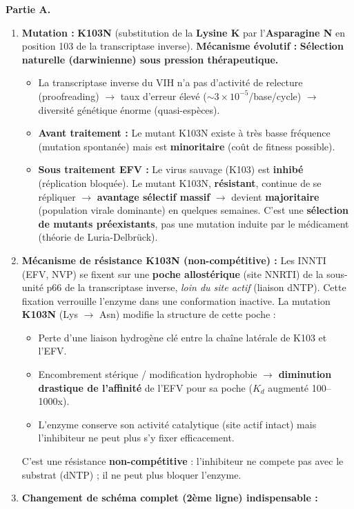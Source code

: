 \documentclass[11pt]{article}
\begin{document}
\begin{corrige}
\textbf{Partie A.}
\begin{enumerate}
\item \textbf{Mutation :} \textbf{K103N} (substitution de la \textbf{Lysine K} par l'\textbf{Asparagine N} en position 103 de la transcriptase inverse).
\textbf{Mécanisme évolutif :} \textbf{Sélection naturelle (darwinienne) sous pression thérapeutique.}
\begin{itemize}
\item La transcriptase inverse du VIH n'a pas d'activité de relecture (proofreading) $\to$ taux d'erreur élevé ($\sim 3 \times 10^{-5}$/base/cycle) $\to$ diversité génétique énorme (quasi-espèces).
\item \textbf{Avant traitement :} Le mutant K103N existe à très basse fréquence (mutation spontanée) mais est \textbf{minoritaire} (coût de fitness possible).
\item \textbf{Sous traitement EFV :} Le virus sauvage (K103) est \textbf{inhibé} (réplication bloquée). Le mutant K103N, \textbf{résistant}, continue de se répliquer $\to$ \textbf{avantage sélectif massif} $\to$ devient \textbf{majoritaire} (population virale dominante) en quelques semaines. C'est une \textbf{sélection de mutants préexistants}, pas une mutation induite par le médicament (théorie de Luria-Delbrück).
\end{itemize}
\item \textbf{Mécanisme de résistance K103N (non-compétitive) :}
Les INNTI (EFV, NVP) se fixent sur une \textbf{poche allostérique} (site NNRTI) de la sous-unité p66 de la transcriptase inverse, \emph{loin du site actif} (liaison dNTP). Cette fixation verrouille l'enzyme dans une conformation inactive.
La mutation \textbf{K103N} (Lys $\to$ Asn) modifie la structure de cette poche :
\begin{itemize}
\item Perte d'une liaison hydrogène clé entre la chaîne latérale de K103 et l'EFV.
\item Encombrement stérique / modification hydrophobie $\to$ \textbf{diminution drastique de l'affinité} de l'EFV pour sa poche ($K_d$ augmenté 100--1000x).
\item L'enzyme conserve son activité catalytique (site actif intact) mais l'inhibiteur ne peut plus s'y fixer efficacement.
\end{itemize}
C'est une résistance \textbf{non-compétitive} : l'inhibiteur ne compete pas avec le substrat (dNTP) ; il ne peut plus bloquer l'enzyme.
\item \textbf{Changement de schéma complet (2ème ligne) indispensable :}

\end{enumerate}
\end{corrige}
\end{document}
